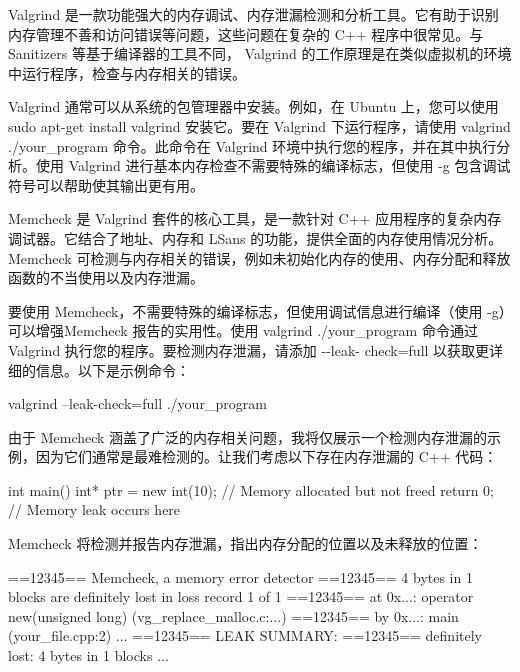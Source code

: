 
Valgrind 是一款功能强大的内存调试、内存泄漏检测和分析工具。它有助于识别内存管理不善和访问错误等问题，这些问题在复杂的 C++ 程序中很常见。与 Sanitizers 等基于编译器的工具不同， Valgrind 的工作原理是在类似虚拟机的环境中运行程序，检查与内存相关的错误。


Valgrind 通常可以从系统的包管理器中安装。例如，在 Ubuntu 上，您可以使用 sudo apt-get install valgrind 安装它。要在 Valgrind 下运行程序，请使用 valgrind ./your\_program 命令。此命令在 Valgrind 环境中执行您的程序，并在其中执行分析。使用 Valgrind 进行基本内存检查不需要特殊的编译标志，但使用 -g 包含调试符号可以帮助使其输出更有用。


Memcheck 是 Valgrind 套件的核心工具，是一款针对 C++ 应用程序的复杂内存调试器。它结合了地址、内存和 LSans 的功能，提供全面的内存使用情况分析。 Memcheck 可检测与内存相关的错误，例如未初始化内存的使用、内存分配和释放函数的不当使用以及内存泄漏。

要使用 Memcheck，不需要特殊的编译标志，但使用调试信息进行编译（使用 -g）可以增强Memcheck 报告的实用性。使用 valgrind ./your\_program 命令通过 Valgrind 执行您的程序。要检测内存泄漏，请添加 -{}-leak- check=full 以获取更详细的信息。以下是示例命令：

\begin{shell}
valgrind --leak-check=full ./your_program
\end{shell}

由于 Memcheck 涵盖了广泛的内存相关问题，我将仅展示一个检测内存泄漏的示例，因为它们通常是最难检测的。让我们考虑以下存在内存泄漏的 C++ 代码：

\begin{cpp}
int main() {
    int* ptr = new int(10); // Memory allocated but not freed
    return 0; // Memory leak occurs here
}
\end{cpp}

Memcheck 将检测并报告内存泄漏，指出内存分配的位置以及未释放的位置：

\begin{shell}
==12345== Memcheck, a memory error detector
==12345== 4 bytes in 1 blocks are definitely lost in loss record 1 of 1
==12345== at 0x...: operator new(unsigned long) (vg_replace_malloc.c:...)
==12345== by 0x...: main (your_file.cpp:2)
...
==12345== LEAK SUMMARY:
==12345== definitely lost: 4 bytes in 1 blocks
...
\end{shell}

